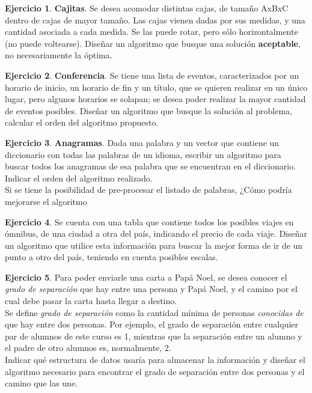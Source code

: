\documentclass[11pt,a4paper]{article}
\theoremstyle{definition}
\newtheorem{ejercicio}{Ejercicio}[section]
\begin{document}
\begin{ejercicio}
\textbf{Cajitas}. Se desea acomodar distintas cajas, de tamaño AxBxC dentro
de cajas de mayor tamaño.  Las cajas vienen dadas por sus medidas, y
una cantidad asociada a cada medida.  Se las puede rotar, pero sólo
horizontalmente (no puede voltearse). Diseñar un algoritmo que busque
una solución \textbf{aceptable}, no necesariamente la óptima.
\end{ejercicio}

\begin{ejercicio}
\textbf{Conferencia}. Se tiene una lista de eventos, caracterizados por un
horario de inicio, un horario de fin y un título, que se quieren realizar
en un único lugar, pero algunos horarios se solapan; se desea poder
realizar la mayor cantidad de eventos posibles.  Diseñar un algoritmo que
busque la solución al problema, calcular el orden del algoritmo propuesto.
\end{ejercicio}

\begin{ejercicio}
\textbf{Anagramas}. Dada una palabra y un vector que contiene un
diccionario con todas las palabras de un idioma, escribir un algoritmo para
buscar todos los anagramas de esa palabra que se encuentran en el
diccionario.  Indicar el orden del algoritmo realizado. \\
Si se tiene la posibilidad de pre-procesar el listado de palabras, ¿Cómo
podría mejorarse el algoritmo
\end{ejercicio}

\begin{ejercicio}
Se cuenta con una tabla que contiene todos los posibles viajes en
ómnibus, de una ciudad a otra del país, indicando el precio de cada viaje.
Diseñar un algoritmo que utilice esta información para buscar la mejor
forma de ir de un punto a otro del país, teniendo en cuenta posibles
escalas.
\end{ejercicio}

\begin{ejercicio}
Para poder enviarle una carta a Papá Noel, se desea conocer el \textit{grado de
separación} que hay entre una persona y Papá Noel, y el camino por el cual
debe pasar la carta hasta llegar a destino. \\
Se define \textit{grado de separación} como la cantidad mínima de personas
\textit{conocidas de} que hay entre dos personas.  Por ejemplo, el grado de
separación entre cualquier par de alumnos de este curso es 1, mientras que
la separación entre un alumno y el padre de otro alumnos es, normalmente,
2. \\
Indicar qué estructura de datos usaría para almacenar la información y
diseñar el algoritmo necesario para encontrar el grado de separación entre
dos personas y el camino que las une.
\end{ejercicio}
\end{document}
